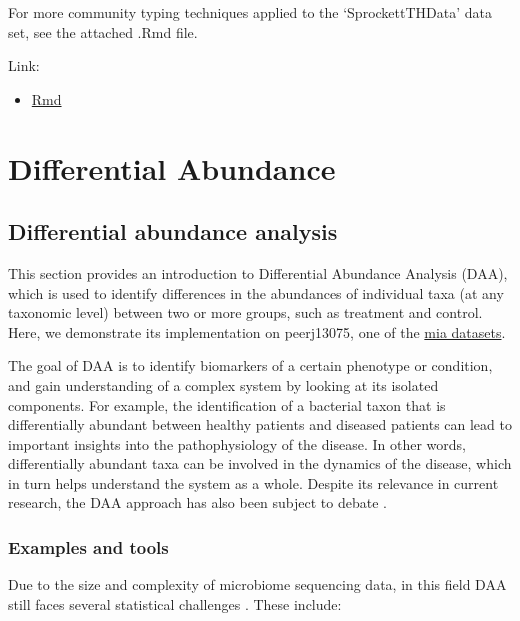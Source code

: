 \documentclass[
]{book}
\providecommand{\tightlist}{%
  \setlength{\itemsep}{0pt}\setlength{\parskip}{0pt}}
\begin{document}
For more community typing techniques applied to the `SprockettTHData'
data set, see the attached .Rmd file.

Link:

\begin{itemize}
\tightlist
\item
  \href{add-comm-typing.Rmd}{Rmd}
\end{itemize}

\hypertarget{differential-abundance}{%
\chapter{Differential Abundance}\label{differential-abundance}}

\hypertarget{differential-abundance-analysis}{%
\section{Differential abundance analysis}\label{differential-abundance-analysis}}

This section provides an introduction to Differential Abundance Analysis (DAA),
which is used to identify differences in the abundances of individual taxa (at
any taxonomic level) between two or more groups, such as treatment and control.
Here, we demonstrate its implementation on peerj13075, one of the \protect\hyperlink{package-data}{mia datasets}.

The goal of DAA is to identify biomarkers of a certain phenotype or condition,
and gain understanding of a complex system by looking at its isolated components.
For example, the identification of a bacterial taxon that is differentially
abundant between healthy patients and diseased patients can lead to important
insights into the pathophysiology of the disease. In other words, differentially
abundant taxa can be involved in the dynamics of the disease, which in turn helps
understand the system as a whole. Despite its relevance in current research,
the DAA approach has also been subject to debate \citep{Quinn2021}.

\hypertarget{examples-and-tools}{%
\subsection{Examples and tools}\label{examples-and-tools}}

Due to the size and complexity of microbiome sequencing data, in this field
DAA still faces several statistical challenges \citep{Yang2022}. These include:
\end{document}
